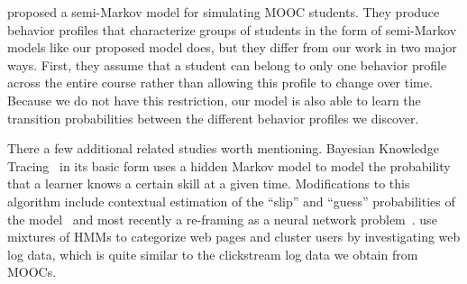 \citet{Faucon:2016:EDM} proposed a semi-Markov model for simulating MOOC
students. They produce behavior profiles that characterize groups of
students in the form of semi-Markov models like our proposed model does,
but they differ from our work in two major ways. First, they assume that a
student can belong to only one behavior profile across the entire course
rather than allowing this profile to change over time.  Because we do not
have this restriction, our model is also able to learn the transition
probabilities between the different behavior profiles we discover.

There a few additional related studies worth mentioning.
Bayesian Knowledge Tracing~\cite{Corbett:1994:UMUAI} in its basic form uses
a hidden Markov model to model the probability that a learner knows a
certain skill at a given time. Modifications to this algorithm include
contextual estimation of the ``slip'' and ``guess'' probabilities of the
model~\cite{Baker:2008:ITS} and most recently a re-framing as a neural
network problem~\cite{Piech:2015:NIPS}.
\citet{Ypma:2002:Springer} use mixtures of HMMs to categorize web pages and
cluster users by investigating web log data, which is quite similar to the
clickstream log data we obtain from MOOCs.

